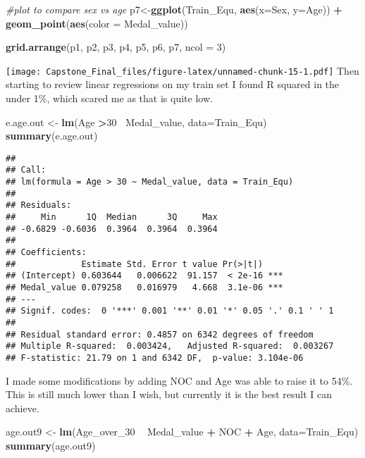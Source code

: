 \documentclass[]{article}
\newenvironment{Shaded}{\begin{snugshade}}{\end{snugshade}}
\newcommand{\KeywordTok}[1]{\textcolor[rgb]{0.13,0.29,0.53}{\textbf{#1}}}
\newcommand{\DataTypeTok}[1]{\textcolor[rgb]{0.13,0.29,0.53}{#1}}
\newcommand{\DecValTok}[1]{\textcolor[rgb]{0.00,0.00,0.81}{#1}}
\newcommand{\StringTok}[1]{\textcolor[rgb]{0.31,0.60,0.02}{#1}}
\newcommand{\CommentTok}[1]{\textcolor[rgb]{0.56,0.35,0.01}{\textit{#1}}}
\newcommand{\OperatorTok}[1]{\textcolor[rgb]{0.81,0.36,0.00}{\textbf{#1}}}
\newcommand{\NormalTok}[1]{#1}
\begin{document}
\begin{Shaded}
\begin{Highlighting}[]
\CommentTok{#plot to compare sex vs age}
\NormalTok{p7<-}\KeywordTok{ggplot}\NormalTok{(Train_Equ, }\KeywordTok{aes}\NormalTok{(}\DataTypeTok{x=}\NormalTok{Sex, }\DataTypeTok{y=}\NormalTok{Age)) }\OperatorTok{+}
\StringTok{  }\KeywordTok{geom_point}\NormalTok{(}\KeywordTok{aes}\NormalTok{(}\DataTypeTok{color =}\NormalTok{ Medal_value))}

\KeywordTok{grid.arrange}\NormalTok{(p1, p2, p3, p4, p5, p6, p7, }\DataTypeTok{ncol =} \DecValTok{3}\NormalTok{)}
\end{Highlighting}
\end{Shaded}

\texttt{[image: Capstone\_Final\_files/figure-latex/unnamed-chunk-15-1.pdf]}
Then starting to review linear regressions on my train set I found R
squared in the under 1\%, which scared me as that is quite low.

\begin{Shaded}
\begin{Highlighting}[]
\NormalTok{e.age.out <-}\StringTok{ }\KeywordTok{lm}\NormalTok{(Age }\OperatorTok{>}\DecValTok{30} \OperatorTok{~}\NormalTok{Medal_value,}
              \DataTypeTok{data=}\NormalTok{Train_Equ)}
\KeywordTok{summary}\NormalTok{(e.age.out)}
\end{Highlighting}
\end{Shaded}

\begin{verbatim}
## 
## Call:
## lm(formula = Age > 30 ~ Medal_value, data = Train_Equ)
## 
## Residuals:
##     Min      1Q  Median      3Q     Max 
## -0.6829 -0.6036  0.3964  0.3964  0.3964 
## 
## Coefficients:
##             Estimate Std. Error t value Pr(>|t|)    
## (Intercept) 0.603644   0.006622  91.157  < 2e-16 ***
## Medal_value 0.079258   0.016979   4.668  3.1e-06 ***
## ---
## Signif. codes:  0 '***' 0.001 '**' 0.01 '*' 0.05 '.' 0.1 ' ' 1
## 
## Residual standard error: 0.4857 on 6342 degrees of freedom
## Multiple R-squared:  0.003424,   Adjusted R-squared:  0.003267 
## F-statistic: 21.79 on 1 and 6342 DF,  p-value: 3.104e-06
\end{verbatim}

I made some modifications by adding NOC and Age was able to raise it to
54\%. This is still much lower than I wish, but currently it is the best
result I can achieve.

\begin{Shaded}
\begin{Highlighting}[]
\NormalTok{age.out9 <-}\StringTok{ }\KeywordTok{lm}\NormalTok{(Age_over_}\DecValTok{30} \OperatorTok{~}\StringTok{ }\NormalTok{Medal_value }\OperatorTok{+}\StringTok{ }\NormalTok{NOC }\OperatorTok{+}\StringTok{ }\NormalTok{Age,}
                 \DataTypeTok{data=}\NormalTok{Train_Equ)}
\KeywordTok{summary}\NormalTok{(age.out9)}
\end{Highlighting}
\end{Shaded}
\end{document}
